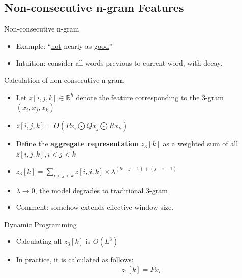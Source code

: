 \documentclass[compress]{beamer}
\begin{document}
    \subsection{Non-consecutive n-gram Features}
        \begin{frame}[allowframebreaks]{\subsecname}
            \begin{block}{Non-consecutive n-gram}
                \begin{itemize}
                    \item Example: ``\underline{not} nearly as \underline{good}'' 
                    \item Intuition: consider all words previous to current word, with decay.
                \end{itemize}
            \end{block}
        \framebreak
            \begin{block}{Calculation of non-consecutive n-gram}
                \begin{itemize}
                    \item Let $z[i,j,k] \in \mathbb{R}^h$ denote the feature corresponding to the 3-gram $(x_i, x_j, x_k)$ 
                    \item $z[i,j,k] = O(Px_i \bigodot Qx_j \bigodot Rx_k)$
                    \item Define the \textbf{aggregate representation} $z_3[k]$ as a weighted sum of all $z[i,j,k], i<j<k$
                    \item $z_3[k] = \sum\limits_{i<j<k}z[i,j,k] \times \lambda^{(k-j-1)+(j-i-1)}$
                    \item $\lambda \rightarrow 0$, the model degrades to traditional 3-gram
                    \item Comment: somehow extends effective window size. 
                \end{itemize}
            \end{block}
                \framebreak
            \begin{block}{Dynamic Programming}
                \begin{itemize}
                    \item Calculating all $z_3[k]$ is $O(L^3)$
                    \item In practice, it is calculated as follows:
                    \begin{equation*}
                        \begin{aligned}
                            & z_1[k] = Px_i \\

\end{aligned}
\end{equation*}
\end{itemize}
\end{block}
\end{frame}
\end{document}
